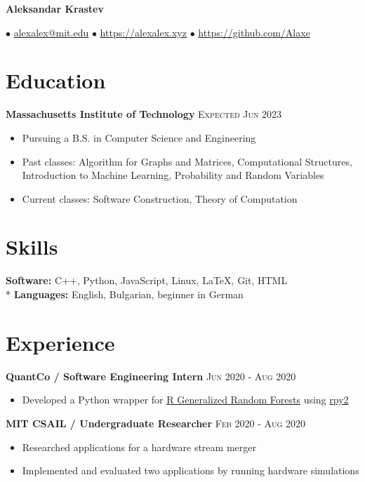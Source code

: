 \documentclass[letterpaper,11pt]{article}
\author{Aleksandar Krastev}
\date{2019-09-03}
\newcommand{\noskip}{\vspace{-\parskip}}
\begin{document}
\setlength{\belowdisplayskip}{\parskip}
\setlength{\belowdisplayshortskip}{\belowdisplayskip}
\setlength{\abovedisplayskip}{\parskip}
\setlength{\abovedisplayshortskip}{\abovedisplayskip}


\centerline{{\Huge \bf Aleksandar Krastev}}
$\bullet$ \href{mailto:alexalex@mit.edu}{alexalex@mit.edu} \hfill
$\bullet$ \href{https://alexalex.xyz}{https://alexalex.xyz} \hfill
$\bullet$ \href{https://github.com/Alaxe}{https://github.com/Alaxe} \hfill

\noskip
\section*{Education}
\textbf{Massachusetts Institute of Technology}
\hfill
\textsc{Expected Jun 2023}

\noskip
\begin{itemize}
    \item Pursuing a B.S. in Computer Science and Engineering
    \item Past classes:
        Algorithm for Graphs and Matrices,
        Computational Structures,
        Introduction to Machine Learning,
        Probability and Random Variables
    \item Current classes:
        Software Construction, Theory of Computation
\end{itemize}

\section*{Skills}
\textbf{Software:} C++, Python, JavaScript, Linux, LaTeX, Git, HTML\\*
\textbf{Languages:} English, Bulgarian, beginner in German

\section*{Experience}
\textbf{QuantCo / Software Engineering Intern}
\hfill
\textsc{Jun 2020 - Aug 2020}
\noskip
\begin{itemize}
    \item Developed a Python wrapper for
        \href{https://grf-labs.github.io/}{R Generalized Random Forests} using
        \href{https://rpy2.github.io/}{rpy2}
\end{itemize}

\textbf{MIT CSAIL / Undergraduate Researcher}
\hfill
\textsc{Feb 2020 - Aug 2020}
\noskip
\begin{itemize}
    \item Researched applications for a hardware stream merger
    \item Implemented and evaluated two applications by running hardware
        simulations
\end{itemize}
\end{document}
